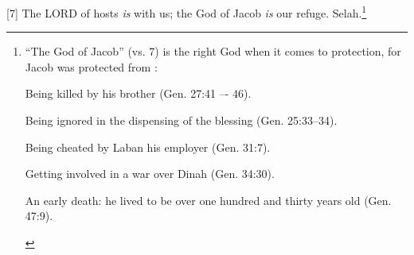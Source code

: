 [7] \textcolor[rgb]{0.00,0.00,1.00}{The LORD of hosts \emph{is} with us; the God of Jacob \emph{is} our refuge. Selah.}\footnote{“The God of Jacob” (vs. 7) is the right God when it comes to protection, for Jacob was protected from  \cite{Ruckman1992Psalms}:
\begin{compactenum}
    \item Being killed by his brother (Gen. 27:41 –- 46).
    \item Being ignored in the dispensing of the blessing (Gen. 25:33–34).
    \item Being cheated by Laban his employer (Gen. 31:7).
    \item Getting involved in a war over Dinah (Gen. 34:30).
    \item An early death: he lived to be over one hundred and thirty years old (Gen. 47:9).
\end{compactenum} }
